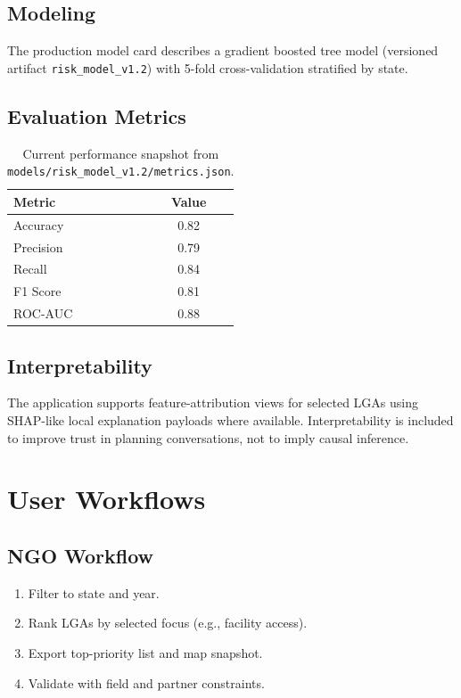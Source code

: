 \documentclass[11pt]{article}
\begin{document}
\subsection{Modeling}
The production model card describes a gradient boosted tree model (versioned artifact \texttt{risk\_model\_v1.2}) with 5-fold cross-validation stratified by state.

\subsection{Evaluation Metrics}
\begin{table}[h]
\centering
\begin{tabular}{lc}
\toprule
\textbf{Metric} & \textbf{Value} \\
\midrule
Accuracy & 0.82 \\
Precision & 0.79 \\
Recall & 0.84 \\
F1 Score & 0.81 \\
ROC-AUC & 0.88 \\
\bottomrule
\end{tabular}
\caption{Current performance snapshot from \texttt{models/risk\_model\_v1.2/metrics.json}.}
\end{table}

\subsection{Interpretability}
The application supports feature-attribution views for selected LGAs using SHAP-like local explanation payloads where available. Interpretability is included to improve trust in planning conversations, not to imply causal inference.

\section{User Workflows}
\subsection{NGO Workflow}
\begin{enumerate}[leftmargin=1.5em]
  \item Filter to state and year.
  \item Rank LGAs by selected focus (e.g., facility access).
  \item Export top-priority list and map snapshot.
  \item Validate with field and partner constraints.
\end{enumerate}
\end{document}
